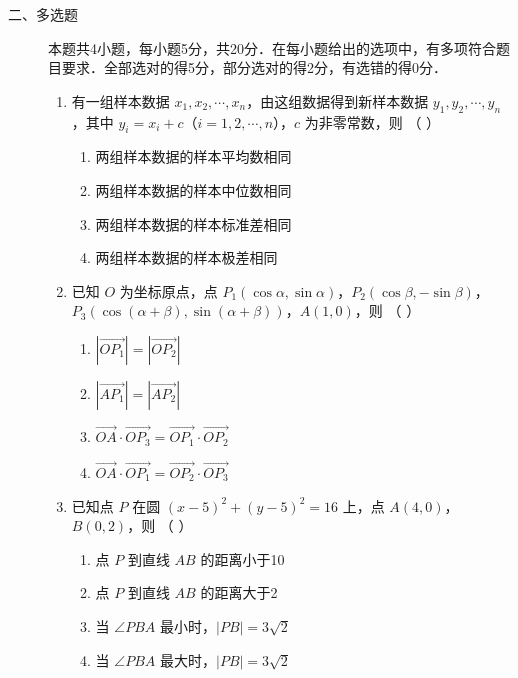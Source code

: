 \begin{description}
    \item[二、多选题] 本题共4小题，每小题5分，共20分．在每小题给出的选项中，有多项符合题目要求．全部选对的得5分，部分选对的得2分，有选错的得0分．
    \begin{enumerate}[leftmargin=5pt]
      \addtocounter{enumi}{+8}
        \item 有一组样本数据 $x_{1},x_{2},\cdots,x_{n}$，由这组数据得到新样本数据 $y_{1},y_{2},\cdots,y_{n}$，其中 $y_{i}=x_{i}+c$（$i=1,2,\cdots,n$），$c$ 为非零常数，则 （ ）
        \begin{enumerate}[label=\Alph*.]
            \item 两组样本数据的样本平均数相同
            \item 两组样本数据的样本中位数相同
            \item 两组样本数据的样本标准差相同
            \item 两组样本数据的样本极差相同
        \end{enumerate}

        \item 已知 $O$ 为坐标原点，点 $P_{1}(\cos\alpha,\sin\alpha)$，$P_{2}(\cos\beta,-\sin\beta)$，$P_{3}(\cos(\alpha+\beta),\sin(\alpha+\beta))$，$A(1,0)$，则 （ ）
        \begin{enumerate}[label=\Alph*.]
            \item $\left|\overrightarrow{OP_{1}}\right|=\left|\overrightarrow{OP_{2}}\right|$
            \item $\left|\overrightarrow{AP_{1}}\right|=\left|\overrightarrow{AP_{2}}\right|$
            \item $\overrightarrow{OA}\cdot\overrightarrow{OP_{3}}=\overrightarrow{OP_{1}}\cdot\overrightarrow{OP_{2}}$
            \item $\overrightarrow{OA}\cdot\overrightarrow{OP_{1}}=\overrightarrow{OP_{2}}\cdot\overrightarrow{OP_{3}}$
        \end{enumerate}

        \item 已知点 $P$ 在圆 $(x-5)^{2}+(y-5)^{2}=16$ 上，点 $A(4,0)$，$B(0,2)$，则 （ ）
        \begin{enumerate}[label=\Alph*.]
            \item 点 $P$ 到直线 $AB$ 的距离小于10
            \item 点 $P$ 到直线 $AB$ 的距离大于2
            \item 当 $\angle PBA$ 最小时，$|PB|=3\sqrt{2}$
            \item 当 $\angle PBA$ 最大时，$|PB|=3\sqrt{2}$
        \end{enumerate}


\end{enumerate}
\end{description}
